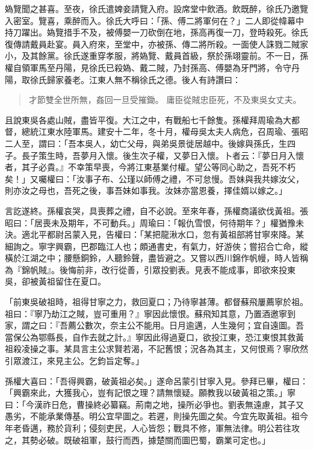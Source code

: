 媯覽聞之甚喜。至夜，徐氏遣婢妾請覽入府。設席堂中飲酒。飲既醉，徐氏乃邀覽入密室。覽喜，乘醉而入。徐氏大呼曰：「孫、傅二將軍何在？」二人即從幃幕中持刀躍出。媯覽措手不及，被傅嬰一刀砍倒在地，孫高再復一刀，登時殺死。徐氏復傳請戴員赴宴。員入府來，至堂中，亦被孫、傳二將所殺。一面使人誅戮二賊家小，及其餘黨。徐氏遂重穿孝服，將媯覽、戴員首級，祭於孫翊靈前。不一日，孫權自領軍馬至丹陽，見徐氏已殺媯、戴二賊，乃封孫高、傅嬰為牙門將，令守丹陽，取徐氏歸家養老。江東人無不稱徐氏之德。後人有詩讚曰：

\begin{quote}
才節雙全世所無，姦回一旦受摧鋤。
庸臣從賊忠臣死，不及東吳女丈夫。
\end{quote}

且說東吳各處山賊，盡皆平復。大江之中，有戰船七千餘隻。孫權拜周瑜為大都督，總統江東水陸軍馬。建安十二年，冬十月，權母吳太夫人病危，召周瑜、張昭二人至，謂曰：「吾本吳人，幼亡父母，與弟吳景徙居越中。後嫁與孫氏，生四子。長子策生時，吾夢月入懷。後生次子權，又夢日入懷。卜者云：『夢日月入懷者，其子必貴。』不幸策早喪，今將江東基業付權。望公等同心助之，吾死不朽矣！」又囑權曰：「汝事子布、公瑾以師傅之禮，不可怠慢。吾妹與我共嫁汝父，則亦汝之母也，吾死之後，事吾妹如事我。汝妹亦當恩養，擇佳婿以嫁之。」

言訖遂終。孫權哀哭，具喪葬之禮，自不必說。至來年春，孫權商議欲伐黃祖。張昭曰：「居喪未及期年，不可動兵。」周瑜曰：「報仇雪恨，何待期年？」權猶豫未決。適北平都尉呂蒙入見，告權曰：「某把龍湫水口，忽有黃祖部將甘寧來降。某細詢之。寧字興霸，巴郡臨江人也；頗通書史，有氣力，好游俠；嘗招合亡命，縱橫於江湖之中；腰懸銅鈴，人聽鈴聲，盡皆避之。又嘗以西川錦作帆幔，時人皆稱為『錦帆賊』。後悔前非，改行從善，引眾投劉表。見表不能成事，即欲來投東吳，卻被黃祖留住在夏口。

「前東吳破祖時，祖得甘寧之力，救回夏口；乃待寧甚薄。都督蘇飛屢薦寧於祖。祖曰：『寧乃劫江之賊，豈可重用？』寧因此懷恨。蘇飛知其意，乃置酒邀寧到家，謂之曰：『吾薦公數次，奈主公不能用。日月逾邁，人生幾何；宜自遠圖。吾當保公為鄂縣長，自作去就之計。』寧因此得過夏口，欲投江東，恐江東恨其救黃祖殺凌操之事。某具言主公求賢若渴，不記舊恨；況各為其主，又何恨焉？寧欣然引眾渡江，來見主公。乞鈞旨定奪。」

孫權大喜曰：「吾得興霸，破黃祖必矣。」遂命呂蒙引甘寧入見。參拜已畢，權曰：「興霸來此，大獲我心，豈有記恨之理？請無懷疑。願教我以破黃祖之策。」寧曰：「今漢祚日危，曹操終必纂竊。荊南之地，操所必爭也。劉表無遠慮，其子又愚劣，不能承業傳基。明公宜早圖之。若遲，則操先圖之矣。今宜先取黃祖。祖今年老昏邁，務於貨利；侵刻吏民，人心皆怨；戰具不修，軍無法律。明公若往攻之，其勢必破。既破祖軍，鼓行而西，據楚關而圖巴蜀，霸業可定也。」

